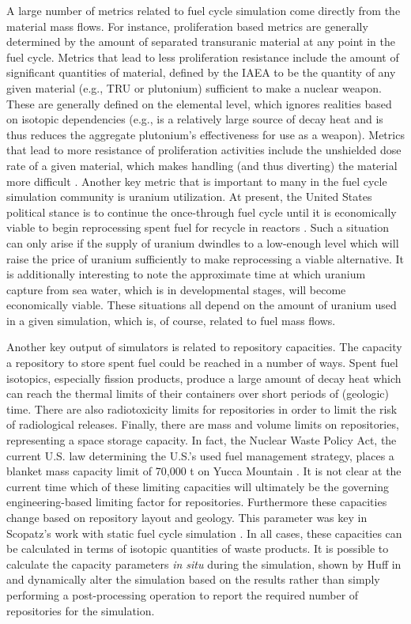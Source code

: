A large number of metrics related to fuel cycle simulation come directly from
the material mass flows. For instance, proliferation based metrics are generally
determined by the amount of separated transuranic material at any point in the
fuel cycle. Metrics that lead to less proliferation resistance include the
amount of significant quantities of material, defined by the IAEA to be the
quantity of any given material (e.g., TRU or plutonium) sufficient to make a
nuclear weapon. These are generally defined on the elemental level, which
ignores realities based on isotopic dependencies (e.g.,  is a
relatively large source of decay heat and is thus reduces the aggregate
plutonium's effectiveness for use as a weapon). Metrics that lead to more
resistance of proliferation activities include the unshielded dose rate of a
given material, which makes handling (and thus diverting) the material more
difficult \cite{yacout_vision_2006}. Another key metric that is important to
many in the fuel cycle simulation community is uranium utilization. At present,
the United States political stance is to continue the once-through fuel cycle
until it is economically viable to begin reprocessing spent fuel for recycle in
reactors \cite{hamilton_blue_2012}. Such a situation can only arise if the
supply of uranium dwindles to a low-enough level which will raise the price of
uranium sufficiently to make reprocessing a viable alternative. It is
additionally interesting to note the approximate time at which uranium capture
from sea water, which is in developmental stages, will become economically
viable. These situations all depend on the amount of uranium used in a given
simulation, which is, of course, related to fuel mass flows.

Another key output of simulators is related to repository capacities. The
capacity a repository to store spent fuel could be reached in a number of
ways. Spent fuel isotopics, especially fission products, produce a large amount
of decay heat which can reach the thermal limits of their containers over short
periods of (geologic) time. There are also radiotoxicity limits for repositories
in order to limit the risk of radiological releases. Finally, there are mass and
volume limits on repositories, representing a space storage capacity. In fact,
the Nuclear Waste Policy Act, the current U.S. law determining the U.S.'s used
fuel management strategy, places a blanket mass capacity limit of 70,000 t on
Yucca Mountain \cite{us_nuclear_1982}.  It is not clear at the current time
which of these limiting capacities will ultimately be the governing
engineering-based limiting factor for repositories. Furthermore these capacities
change based on repository layout and geology.  This parameter was key in
Scopatz's work with static fuel cycle simulation
\cite{scopatz_essential_2011}. In all cases, these capacities can be calculated
in terms of isotopic quantities of waste products. It is possible to calculate
the capacity parameters \textit{in situ} during the simulation, shown by Huff in
\cite{huff_integrated_2013} and dynamically alter the simulation based on the
results rather than simply performing a post-processing operation to report the
required number of repositories for the simulation.
